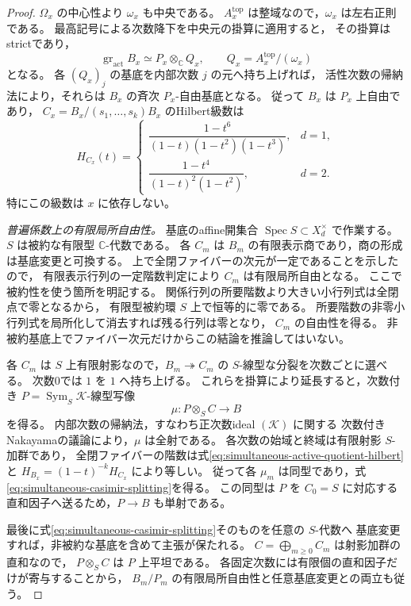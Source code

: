 \begin{proof}
$\Omega_x$ の中心性より $\omega_x$ も中央である。
$A_x^{\mathrm{top}}$ は整域なので，$\omega_x$ は左右正則である。
最高記号による次数降下を中央元の掛算に適用すると，
その掛算はstrictであり，
\begin{equation}\label{eq:simultaneous-casimir-fiber-gr}
 \operatorname{gr}_{\mathrm{act}}B_x
  \simeq P_x\otimes_{\mathbb C}Q_x,
 \qquad Q_x=A_x^{\mathrm{top}}/(\omega_x)
\end{equation}
となる。
各 $(Q_x)_j$ の基底を内部次数 $j$ の元へ持ち上げれば，
活性次数の帰納法により，それらは $B_x$ の斉次 $P_x$-自由基底となる。
従って $B_x$ は $P_x$ 上自由であり，
$C_x=B_x/(s_1,\ldots,s_k)B_x$ のHilbert級数は
\begin{equation}\label{eq:simultaneous-active-quotient-hilbert}
 H_{C_x}(t)=
 \begin{cases}
 \dfrac{1-t^6}{(1-t)(1-t^2)(1-t^3)},&d=1,\\[6pt]
 \dfrac{1-t^4}{(1-t)^2(1-t^2)},&d=2.
 \end{cases}
\end{equation}
特にこの級数は $x$ に依存しない。

\emph{普遍係数上の有限局所自由性。}
基底のaffine開集合 $\operatorname{Spec}S\subset X_d^\times$ で作業する。
$S$ は被約な有限型 $\mathbb C$-代数である。
各 $C_m$ は $B_m$ の有限表示商であり，商の形成は基底変更と可換する。
上で全閉ファイバーの次元が一定であることを示したので，
有限表示行列の一定階数判定により $C_m$ は有限局所自由となる。
ここで被約性を使う箇所を明記する。
関係行列の所要階数より大きい小行列式は全閉点で零となるから，
有限型被約環 $S$ 上で恒等的に零である。
所要階数の非零小行列式を局所化して消去すれば残る行列は零となり，
$C_m$ の自由性を得る。
非被約基底上でファイバー次元だけからこの結論を推論してはいない。

各 $C_m$ は $S$ 上有限射影なので，$B_m\twoheadrightarrow C_m$ の
$S$-線型な分裂を次数ごとに選べる。
次数0では $1$ を $1$ へ持ち上げる。
これらを掛算により延長すると，次数付き $P=\operatorname{Sym}_S\mathcal K$-線型写像
\[
 \mu:P\otimes_SC\longrightarrow B
\]
を得る。
内部次数の帰納法，すなわち正次数ideal $(\mathcal K)$ に関する
次数付きNakayamaの議論により，$\mu$ は全射である。
各次数の始域と終域は有限射影 $S$-加群であり，
全閉ファイバーの階数は式\eqref{eq:simultaneous-active-quotient-hilbert}と
$H_{B_x}=(1-t)^{-k}H_{C_x}$ により等しい。
従って各 $\mu_m$ は同型であり，式\eqref{eq:simultaneous-casimir-splitting}を得る。
この同型は $P$ を $C_0=S$ に対応する直和因子へ送るため，$P\to B$ も単射である。

最後に式\eqref{eq:simultaneous-casimir-splitting}そのものを任意の $S$-代数へ
基底変更すれば，非被約な基底を含めて主張が保たれる。
$C=\bigoplus_{m\ge0}C_m$ は射影加群の直和なので，
$P\otimes_SC$ は $P$ 上平坦である。
各固定次数には有限個の直和因子だけが寄与することから，
$B_m/P_m$ の有限局所自由性と任意基底変更との両立も従う。
\end{proof}

